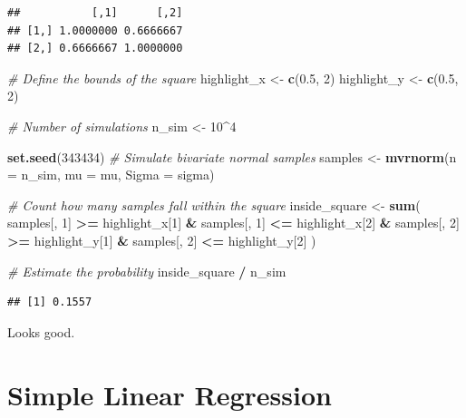\documentclass[
]{book}
\newenvironment{Shaded}{\begin{snugshade}}{\end{snugshade}}
\newcommand{\AttributeTok}[1]{\textcolor[rgb]{0.13,0.29,0.53}{#1}}
\newcommand{\CommentTok}[1]{\textcolor[rgb]{0.56,0.35,0.01}{\textit{#1}}}
\newcommand{\DecValTok}[1]{\textcolor[rgb]{0.00,0.00,0.81}{#1}}
\newcommand{\FloatTok}[1]{\textcolor[rgb]{0.00,0.00,0.81}{#1}}
\newcommand{\FunctionTok}[1]{\textcolor[rgb]{0.13,0.29,0.53}{\textbf{#1}}}
\newcommand{\NormalTok}[1]{#1}
\newcommand{\OtherTok}[1]{\textcolor[rgb]{0.56,0.35,0.01}{#1}}
\newcommand{\SpecialCharTok}[1]{\textcolor[rgb]{0.81,0.36,0.00}{\textbf{#1}}}
\begin{document}
\begin{verbatim}
##           [,1]      [,2]
## [1,] 1.0000000 0.6666667
## [2,] 0.6666667 1.0000000
\end{verbatim}

\begin{Shaded}
\begin{Highlighting}[]
\CommentTok{\# Define the bounds of the square}
\NormalTok{highlight\_x }\OtherTok{\textless{}{-}} \FunctionTok{c}\NormalTok{(}\FloatTok{0.5}\NormalTok{, }\DecValTok{2}\NormalTok{)}
\NormalTok{highlight\_y }\OtherTok{\textless{}{-}} \FunctionTok{c}\NormalTok{(}\FloatTok{0.5}\NormalTok{, }\DecValTok{2}\NormalTok{)}

\CommentTok{\# Number of simulations}
\NormalTok{n\_sim }\OtherTok{\textless{}{-}} \DecValTok{10}\SpecialCharTok{\^{}}\DecValTok{4}

\FunctionTok{set.seed}\NormalTok{(}\DecValTok{343434}\NormalTok{)}
\CommentTok{\# Simulate bivariate normal samples}
\NormalTok{samples }\OtherTok{\textless{}{-}} \FunctionTok{mvrnorm}\NormalTok{(}\AttributeTok{n =}\NormalTok{ n\_sim, }\AttributeTok{mu =}\NormalTok{ mu, }\AttributeTok{Sigma =}\NormalTok{ sigma)}

\CommentTok{\# Count how many samples fall within the square}
\NormalTok{inside\_square }\OtherTok{\textless{}{-}} \FunctionTok{sum}\NormalTok{(}
\NormalTok{  samples[, }\DecValTok{1}\NormalTok{] }\SpecialCharTok{\textgreater{}=}\NormalTok{ highlight\_x[}\DecValTok{1}\NormalTok{] }\SpecialCharTok{\&}\NormalTok{ samples[, }\DecValTok{1}\NormalTok{] }\SpecialCharTok{\textless{}=}\NormalTok{ highlight\_x[}\DecValTok{2}\NormalTok{] }\SpecialCharTok{\&}
\NormalTok{  samples[, }\DecValTok{2}\NormalTok{] }\SpecialCharTok{\textgreater{}=}\NormalTok{ highlight\_y[}\DecValTok{1}\NormalTok{] }\SpecialCharTok{\&}\NormalTok{ samples[, }\DecValTok{2}\NormalTok{] }\SpecialCharTok{\textless{}=}\NormalTok{ highlight\_y[}\DecValTok{2}\NormalTok{]}
\NormalTok{)}

\CommentTok{\# Estimate the probability}
\NormalTok{inside\_square }\SpecialCharTok{/}\NormalTok{ n\_sim}
\end{Highlighting}
\end{Shaded}

\begin{verbatim}
## [1] 0.1557
\end{verbatim}

Looks good.

\chapter{Simple Linear Regression}\label{simple-linear-regression}
\end{document}

